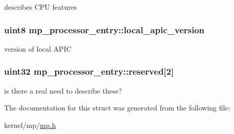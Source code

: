 \label{structmp__processor__entry_a0fee8cc04e85fd4f0622cbbbc8a6832f}
describes CPU features \hypertarget{structmp__processor__entry_a3d219542868b41a3d6c7f45c2d410384}{
\subsubsection[{local\_\-apic\_\-version}]{\setlength{\rightskip}{0pt plus 5cm}uint8 {\bf mp\_\-processor\_\-entry::local\_\-apic\_\-version}}}
\label{structmp__processor__entry_a3d219542868b41a3d6c7f45c2d410384}
version of local APIC \hypertarget{structmp__processor__entry_ab08df8af478d26004574301447ded14d}{
\subsubsection[{reserved}]{\setlength{\rightskip}{0pt plus 5cm}uint32 {\bf mp\_\-processor\_\-entry::reserved}\mbox{[}2\mbox{]}}}
\label{structmp__processor__entry_ab08df8af478d26004574301447ded14d}
is there a real need to describe these? 

The documentation for this struct was generated from the following file:\begin{DoxyCompactItemize}
\item 
kernel/mp/\hyperlink{mp_8h}{mp.h}\end{DoxyCompactItemize}

